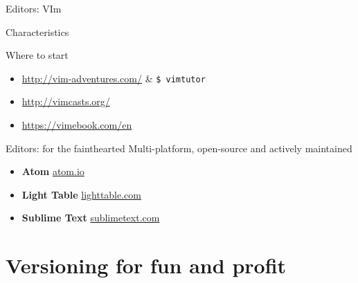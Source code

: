 \documentclass[10pt]{beamer}
\begin{document}
\begin{frame}{Editors: VIm}
{\begin{block}{Characteristics}
\begin{itemize}
			\end{itemize}
		\end{block}
		\begin{block}{Where to start}
			\begin{itemize}
				\item \url{http://vim-adventures.com/} \& \texttt{\$ vimtutor}
				\item \url{http://vimcasts.org/}
				\item \url{https://vimebook.com/en}
			\end{itemize}
		\end{block}
	}
\end{frame}


\begin{frame}{Editors: for the fainthearted} %
	\large
	Multi-platform, open-source and actively maintained

	\medskip

	\begin{itemize}
		\item \textbf{Atom} \hfill \url{atom.io}
		\item \textbf{Light Table} \hfill \url{lighttable.com}
		\item \textbf{Sublime Text} \hfill \url{sublimetext.com}
	  \end{itemize}

\end{frame}

\section{Versioning for fun and profit} %
\end{document}

